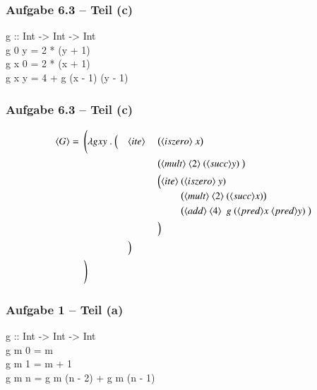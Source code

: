 \documentclass[aspectratio=1610,onlymath, ngerman]{beamer}
\newcommand{\num}[1]{\ensuremath{\langle #1 \rangle}}
\begin{document}
    \begin{frame} \frametitle{Aufgabe 6.3 -- Teil (c)}
    \small
    
	    \begin{ttfamily}
	    	g :: Int -> Int -> Int \\
	    	g 0 y  = 2 * (y + 1) \\
	    	g x 0 = 2 * (x + 1) \\
	    	g x y = 4 + g (x - 1)  (y - 1) \\
	    \end{ttfamily}
    
	\end{frame}
    
    \begin{frame} \frametitle{Aufgabe 6.3 -- Teil (c)}
    \small
	    \begin{alignat*}{3}
	    \num{G} = \enskip & \Biggl( \lambda g xy \ . \ \Bigl( &&\num{ite} \ && \bigl( \num{iszero} \ x \bigr) \\
	    &&&&& \bigl( \num{mult} \ \num{2} \ (\num{succ} y) \ \bigr) \\
	    &&&&& \Bigl( 
	    \begin{alignedat}[t]{1}
	    \num{ite} \ &(\num{iszero} \ y) \\
	    & \bigl( \num{mult} \ \num{2} \ (\num{succ} x) \bigr) \\
	    & \bigl( \num{add} \ \num{4} \enskip g \ (\num{pred} x \ \num{pred} y)  \ \bigr) \\				
	    \end{alignedat} \\
	    &&&&& \Bigr) \\
	    &&& \Bigr) \\
	    & \Biggr)
	    \end{alignat*}
	\end{frame}
	
	\begin{frame} \frametitle{Aufgabe 1 -- Teil (a)}
		\small
		
		\begin{ttfamily}
			g :: Int -> Int -> Int \\
			g m 0 = m \\
			g m 1 = m + 1 \\
			g m n = g m (n - 2) + g m (n - 1) \\
		\end{ttfamily}
	
	\end{frame}
	
\end{document}
